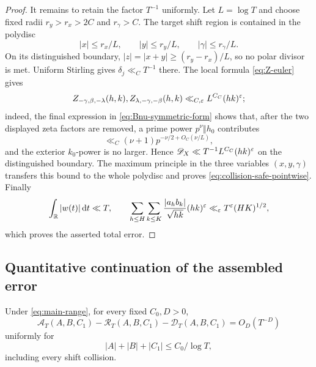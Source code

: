 \begin{proof}
It remains to retain the factor $T^{-1}$ uniformly.  Let $L=\log T$ and
choose fixed radii $r_y>r_x>2C$ and $r_\gamma>C$.  The target shift region is
contained in the polydisc
\[
 |x|\leq r_x/L,\qquad |y|\leq r_y/L,\qquad
 |\gamma|\leq r_\gamma/L.
\]
On its distinguished boundary,
$|z|=|x+y|\geq(r_y-r_x)/L$, so no polar divisor is met.  Uniform Stirling
gives $\delta_j\ll_CT^{-1}$ there.  The local formula
\eqref{eq:Z-euler} gives
\[
 Z_{-\gamma,\beta,-\lambda}(h,k),
 Z_{\lambda,-\gamma,-\beta}(h,k)
 \ll_{C,\varepsilon}L^{C_C}(hk)^\varepsilon;
\]
indeed, the final expression in \eqref{eq:Bnu-symmetric-form} shows that,
after the two displayed zeta factors are removed, a prime power
$p^\nu\Vert h_0$ contributes
\[
 \ll_C(\nu+1)p^{-\nu/2+O_C(\nu/L)},
\]
and the exterior $k_0$-power is no larger.  Hence
$\mathscr D_X\ll T^{-1}L^{C_C}(hk)^\varepsilon$ on the distinguished boundary.
The maximum principle in the three variables $(x,y,\gamma)$ transfers this
bound to the whole polydisc and proves
\eqref{eq:collision-safe-pointwise}.  Finally
\[
 \int_\mathbb R|w(t)|\,\mathrm d t\ll T,
 \qquad
 \sum_{h\leq H}\sum_{k\leq K}
 \frac{|a_hb_k|}{\sqrt{hk}}(hk)^\varepsilon
 \ll_\varepsilon T^\varepsilon(HK)^{1/2},
\]
which proves the asserted total error.
\end{proof}

\subsection{Quantitative continuation of the assembled error}

\begin{proposition}
\label{prop:full-kernel-continuation}
Under \eqref{eq:main-range}, for every fixed $C_0,D>0$,
\begin{equation}\label{eq:full-continuation-result}
 \mathscr A_T(A,B,C_1)-\mathscr R_T(A,B,C_1)
 -\mathscr D_T(A,B,C_1)=O_D(T^{-D})
\end{equation}
uniformly for
\begin{equation}\label{eq:continuation-polydisc}
                    |A|+|B|+|C_1|\leq C_0/\log T,
\end{equation}
including every shift collision.
\end{proposition}

